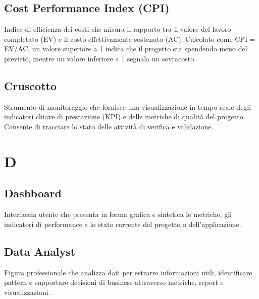 \documentclass[a4paper,11pt]{article}
\begin{document}
\subsection{Cost Performance Index (CPI)}
Indice di efficienza dei costi che misura il rapporto tra il valore del lavoro completato (EV) e il costo effettivamente sostenuto (AC). Calcolato come CPI = EV/AC, un valore superiore a 1 indica che il progetto sta spendendo meno del previsto, mentre un valore inferiore a 1 segnala un sovracosto.






\subsection{Cruscotto}
Strumento di monitoraggio che fornisce una visualizzazione in tempo reale degli indicatori chiave di prestazione (KPI) e delle metriche di qualità del progetto. Consente di tracciare lo stato delle attività di verifica e validazione.

\newpage









\section{D}

\subsection{Dashboard}
Interfaccia utente che presenta in forma grafica e sintetica le metriche, gli indicatori di performance e lo stato corrente del progetto o dell'applicazione.









\subsection{Data Analyst}
Figura professionale che analizza dati per estrarre informazioni utili, identificare pattern e supportare decisioni di business attraverso metriche, report e visualizzazioni.
\end{document}
